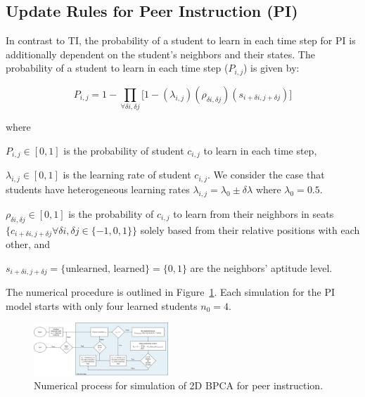 \documentclass[twocolumn,secnumarabic,amssymb, nobibnotes, aps, prd]{revtex4-2}
\begin{document}
    \subsection{Update Rules for Peer Instruction (PI)}

        In contrast to TI, the probability of a student to learn in each time step for PI is additionally dependent on the student's neighbors and their states. The probability of a student to learn in each time step ($P_{i,j}$) is given by:

        \begin{equation}
            \label{eq:BPCA PI learning probability}
                P_{i,j} = 1 - \prod_{\forall \delta i, \delta j}{\lbrack1-(\lambda_{i,j})(\rho_{\delta i, \delta j})(s_{i+\delta i, j+\delta j})}\rbrack
        \end{equation}
        
        where
        
        $P_{i,j} \in [0,1]$ is the probability of student $c_{i,j}$ to learn in each time step, 
        
        $\lambda_{i,j} \in  [0,1]$ is the learning rate of student $c_{i,j}$. We consider the case that students have heterogeneous learning rates $\lambda_{i,j}=\lambda_0 \pm \delta\lambda$ where $\lambda_0=0.5$.
        
        $\rho_{\delta i, \delta j} \in [0,1]$ is the probability of $c_{i,j}$ to learn from their neighbors in seats $\lbrace c_{i+\delta i, j+\delta j} \forall \delta i, \delta j \in \lbrace -1,0,1 \rbrace \rbrace$ solely based from their relative positions with each other, and
        
        $s_{i+\delta i, j+\delta j} = \lbrace\text{unlearned, learned}\rbrace=\lbrace 0,1 \rbrace$ are the neighbors' aptitude level.

        The numerical procedure is outlined in Figure~\ref{fig:PI flowchart}.
        Each simulation for the PI model starts with only four learned students $n_0 = 4$.

        \begin{figure}[htbp!]
            \centering
            \includegraphics[width=0.45\textwidth]{figures/2DBPCA PI Flowchart.png}
            \caption[Peer instruction simulation flowchart]{Numerical process for simulation of 2D BPCA for peer instruction.}
            \label{fig:PI flowchart}
        \end{figure}
\end{document}
